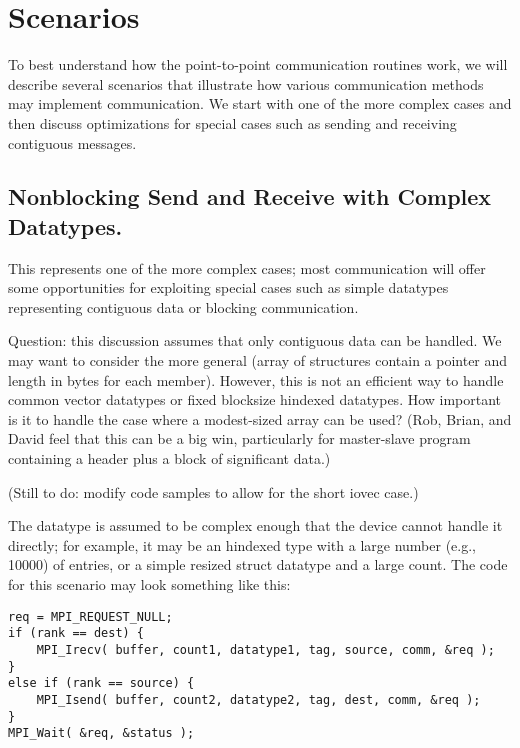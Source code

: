 \newif\ifcodefirst
\codefirstfalse

\section{Scenarios}
\label{sec:pt-2-pt-scenarios}

To best understand how the point-to-point communication routines work, we will
describe several scenarios that illustrate how various communication methods
may implement communication.  We start with one of the more complex cases and
then discuss optimizations for special cases such as sending and receiving
contiguous messages.

\subsection{Nonblocking Send and Receive with Complex Datatypes.}
This represents one of the more complex cases; most communication will offer
some opportunities for exploiting special cases such as simple datatypes
representing contiguous data or blocking communication.  

Question: this discussion assumes that only contiguous data can be handled.
We may want to consider the more general  (array of structures
contain a pointer and length in bytes for each member).  However, this is not
an efficient way to handle common vector datatypes or fixed blocksize hindexed
datatypes.  How important is it to handle the case where a modest-sized
 array can be used?  (Rob, Brian, and David feel that this can be
a big 
win, particularly for master-slave program containing a header plus a
block of significant data.)

(Still to do: modify code samples to allow for the short iovec case.)

The datatype is assumed to be complex enough that the device cannot handle it
directly; for example, it may be an hindexed type with a large number (e.g.,
10000) of entries, or a simple resized struct datatype and a large count.
The code for this scenario may look something like this:
\begin{verbatim}
req = MPI_REQUEST_NULL;
if (rank == dest) {
    MPI_Irecv( buffer, count1, datatype1, tag, source, comm, &req );
}
else if (rank == source) {
    MPI_Isend( buffer, count2, datatype2, tag, dest, comm, &req );
}
MPI_Wait( &req, &status );
\end{verbatim}


